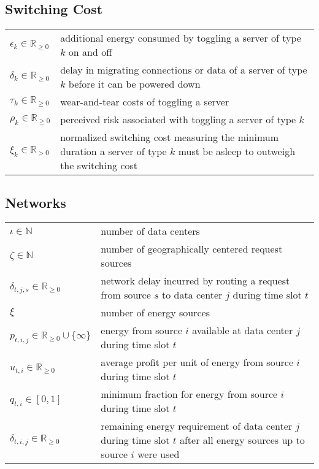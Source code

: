 \subsection*{Switching Cost}

\begin{tabularx}{\textwidth}{p{100pt}X}
    $\epsilon_k \in \mathbb{R}_{\geq 0}$ & additional energy consumed by toggling a server of type $k$ on and off \\
    $\delta_k \in \mathbb{R}_{\geq 0}$ & delay in migrating connections or data of a server of type $k$ before it can be powered down \\
    $\tau_k \in \mathbb{R}_{\geq 0}$ & wear-and-tear costs of toggling a server \\
    $\rho_k \in \mathbb{R}_{\geq 0}$ & perceived risk associated with toggling a server of type $k$ \\
    $\xi_k \in \mathbb{R}_{>0}$ & normalized switching cost measuring the minimum duration a server of type $k$ must be asleep to outweigh the switching cost \\
\end{tabularx}

\subsection*{Networks}

\begin{tabularx}{\textwidth}{p{100pt}X}
    $\iota \in \mathbb{N}$ & number of data centers \\
    $\zeta \in \mathbb{N}$ & number of geographically centered request sources \\
    $\delta_{t,j,s} \in \mathbb{R}_{\geq 0}$ & network delay incurred by routing a request from source $s$ to data center $j$ during time slot $t$ \\
    $\xi$ & number of energy sources \\
    $p_{t,i,j} \in \mathbb{R}_{\geq 0} \cup \{\infty\}$ & energy from source $i$ available at data center $j$ during time slot $t$ \\
    $u_{t,i} \in \mathbb{R}_{\geq 0}$ & average profit per unit of energy from source $i$ during time slot $t$ \\
    $q_{t,i} \in [0,1]$ & minimum fraction for energy from source $i$ during time slot $t$ \\
    $\delta_{t,i,j} \in \mathbb{R}_{\geq 0}$ & remaining energy requirement of data center $j$ during time slot $t$ after all energy sources up to source $i$ were used \\
\end{tabularx}

